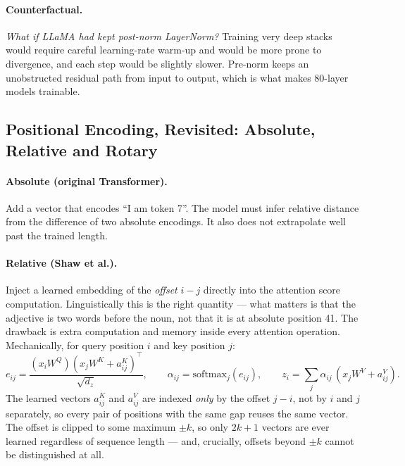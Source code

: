 \documentclass[11pt,a4paper]{article}
\begin{document}
\paragraph{Counterfactual.} \emph{What if LLaMA had kept post-norm LayerNorm?} Training very
deep stacks would require careful learning-rate warm-up and would be more prone to
divergence, and each step would be slightly slower. Pre-norm keeps an unobstructed residual
path from input to output, which is what makes 80-layer models trainable.

\subsection{Positional Encoding, Revisited: Absolute, Relative and Rotary}

\paragraph{Absolute (original Transformer).} Add a vector that encodes ``I am token 7''. The
model must infer relative distance from the difference of two absolute encodings. It also
does not extrapolate well past the trained length.

\paragraph{Relative (Shaw et al.).} Inject a learned embedding of the \emph{offset} $i - j$
directly into the attention score computation. Linguistically this is the right quantity ---
what matters is that the adjective is two words before the noun, not that it is at absolute
position 41. The drawback is extra computation and memory inside every attention operation.
Mechanically, for query position $i$ and key position $j$:
\[
e_{ij} = \frac{(x_i W^Q)(x_j W^K + a_{ij}^K)^\top}{\sqrt{d_z}}, \qquad
\alpha_{ij} = \mathrm{softmax}_j(e_{ij}), \qquad
z_i = \sum_j \alpha_{ij}\,(x_j W^V + a_{ij}^V).
\]
The learned vectors $a_{ij}^K$ and $a_{ij}^V$ are indexed \emph{only} by the offset $j - i$,
not by $i$ and $j$ separately, so every pair of positions with the same gap reuses the same
vector. The offset is clipped to some maximum $\pm k$, so only $2k+1$ vectors are ever learned
regardless of sequence length --- and, crucially, offsets beyond $\pm k$ cannot be
distinguished at all.
\end{document}
